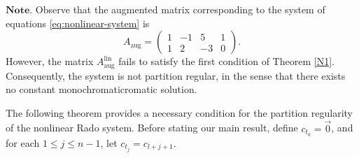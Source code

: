 \documentclass{article}
\theoremstyle{Theorem}
\theoremstyle{definition}
\newtheorem{example}[thm]{Example}
\begin{document}
\noindent$\textbf{Note}.$ Observe that the augmented matrix corresponding to the system of equations \eqref{eq:nonlinear-system} is
\[
A_{\text{aug}} = \begin{pmatrix}
    1 & -1 & 5 &1\\
    1 & 2 & -3&0
\end{pmatrix}.
\]
However, the matrix $A_{\text{aug}}^{\text{lin}}$ fails to satisfy the first condition of Theorem \ref{N1}. Consequently, the system is not partition regular, in the sense that there exists no constant monochromaticromatic solution.

The following theorem provides a necessary condition for the partition regularity of the nonlinear Rado system.
Before stating our main result, define \( c_{t_0} = \vec{0} \), and for each \( 1 \leq j \leq n-1 \), let \( c_{t_j} = c_{l+j+1} \).
\end{document}

